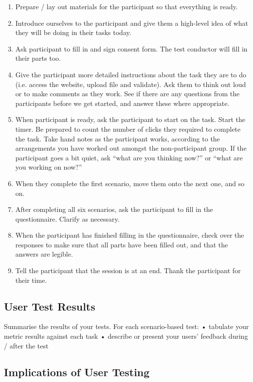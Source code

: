 \documentclass[10pt]{article}
\begin{document}
\begin{enumerate}
\item Prepare / lay out materials for the participant so that everything is ready.
\item Introduce ourselves to the participant and give them a high-level idea of what they will be doing in their tasks today.
\item Ask participant to fill in and sign consent form. The test conductor will fill in their parts too.
\item Give the participant more detailed instructions about the task they are to do (i.e. access the website, upload file and validate). Ask them to think out loud or to make comments as they work. See if there are any questions from the participants before we get started, and answer these where appropriate.
\item When participant is ready, ask the participant to start on the task. Start the timer. Be prepared to count the number of clicks they required to complete the task. Take hand notes as the participant works, according to the arrangements you have worked out amongst the non-participant group. If the participant goes a bit quiet, ask “what are you thinking now?” or “what are you working on now?”
\item When they complete the first scenario, move them onto the next one, and so on.
\item After completing all six scenarios, ask the participant to fill in the questionnaire. Clarify as necessary.
\item When the participant has finished filling in the questionnaire, check over the responses to make sure that all parts have been filled out, and that the answers are legible.
\item Tell the participant that the session is at an end. Thank the participant for their time.
\end{enumerate}

\subsection*{User Test Results}



Summarise the results of your tests. 
For each scenario-based test: 
• tabulate your metric results against each task 
• describe or present your users' feedback during / after the test 

\subsection*{Implications of User Testing}
\end{document}
